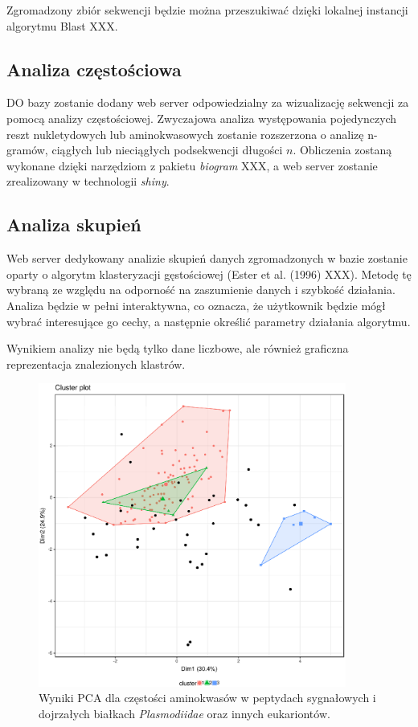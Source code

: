 \documentclass{article}
\begin{document}
Zgromadzony zbiór sekwencji będzie można przeszukiwać dzięki lokalnej instancji 
algorytmu Blast XXX.

\subsection{Analiza częstościowa}

DO bazy zostanie dodany web server odpowiedzialny za wizualizację sekwencji za 
pomocą analizy częstościowej. Zwyczajowa analiza występowania 
pojedynczych reszt nukletydowych lub aminokwasowych zostanie rozszerzona o 
analizę n-gramów, ciągłych lub nieciągłych podsekwencji długości $n$. 
Obliczenia zostaną wykonane dzięki narzędziom z pakietu \textit{biogram} XXX, a 
web server zostanie zrealizowany w technologii \textit{shiny}.

\subsection{Analiza skupień}

Web server dedykowany analizie skupień danych zgromadzonych w bazie zostanie 
oparty o algorytm klasteryzacji gęstościowej (Ester et al. (1996) XXX). Metodę 
tę wybraną ze względu na odporność na zaszumienie danych i szybkość działania. 
Analiza będzie w pełni interaktywna, co oznacza, że użytkownik będzie mógł 
wybrać interesujące go cechy, a następnie określić parametry działania 
algorytmu. 

Wynikiem analizy nie będą tylko dane liczbowe, ale również graficzna 
reprezentacja znalezionych klastrów.


\begin{figure}[htbp]
\centering
\includegraphics[width=0.9\textwidth]{cluster.eps}
\caption{Wyniki PCA dla częstości aminokwasów w peptydach sygnałowych i 
dojrzałych białkach \textit{Plasmodiidae} oraz innych eukariontów.}
\label{fig:cluster}
\end{figure}
\end{document}
